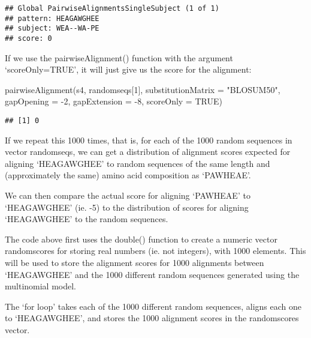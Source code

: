 \documentclass[
]{book}
\newenvironment{Shaded}{\begin{snugshade}}{\end{snugshade}}
\newcommand{\AttributeTok}[1]{\textcolor[rgb]{0.77,0.63,0.00}{#1}}
\newcommand{\ConstantTok}[1]{\textcolor[rgb]{0.00,0.00,0.00}{#1}}
\newcommand{\DecValTok}[1]{\textcolor[rgb]{0.00,0.00,0.81}{#1}}
\newcommand{\FunctionTok}[1]{\textcolor[rgb]{0.00,0.00,0.00}{#1}}
\newcommand{\NormalTok}[1]{#1}
\newcommand{\SpecialCharTok}[1]{\textcolor[rgb]{0.00,0.00,0.00}{#1}}
\newcommand{\StringTok}[1]{\textcolor[rgb]{0.31,0.60,0.02}{#1}}
\begin{document}
\begin{verbatim}
## Global PairwiseAlignmentsSingleSubject (1 of 1)
## pattern: HEAGAWGHEE
## subject: WEA--WA-PE
## score: 0
\end{verbatim}

If we use the pairwiseAlignment() function with the argument `scoreOnly=TRUE', it will just give us the score for the alignment:

\begin{Shaded}
\begin{Highlighting}[]
\FunctionTok{pairwiseAlignment}\NormalTok{(s4, randomseqs[}\DecValTok{1}\NormalTok{], }\AttributeTok{substitutionMatrix =} \StringTok{"BLOSUM50"}\NormalTok{, }\AttributeTok{gapOpening =} \SpecialCharTok{{-}}\DecValTok{2}\NormalTok{,}
  \AttributeTok{gapExtension =} \SpecialCharTok{{-}}\DecValTok{8}\NormalTok{, }\AttributeTok{scoreOnly =} \ConstantTok{TRUE}\NormalTok{)}
\end{Highlighting}
\end{Shaded}

\begin{verbatim}
## [1] 0
\end{verbatim}

If we repeat this 1000 times, that is, for each of the 1000 random sequences in vector randomseqs, we can get a distribution of alignment scores expected for aligning `HEAGAWGHEE' to random sequences of the same length and (approximately the same) amino acid composition as `PAWHEAE'.

We can then compare the actual score for aligning `PAWHEAE' to `HEAGAWGHEE' (ie. -5) to the distribution of scores for aligning `HEAGAWGHEE' to the random sequences.

The code above first uses the double() function to create a numeric vector randomscores for storing real numbers (ie. not integers), with 1000 elements. This will be used to store the alignment scores for 1000 alignments between `HEAGAWGHEE' and the 1000 different random sequences generated using the multinomial model.

The `for loop' takes each of the 1000 different random sequences, aligns each one to `HEAGAWGHEE', and stores the 1000 alignment scores in the randomscores vector.
\end{document}
